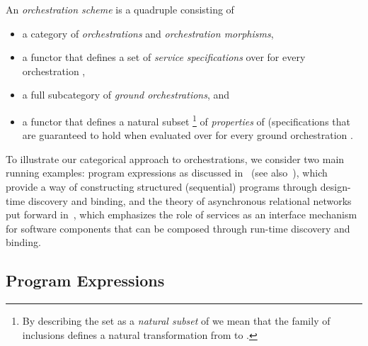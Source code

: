 \documentclass{LMCS}
\begin{document}
\begin{defi}
  An \emph{orchestration scheme} is a quadruple  consisting of
  \begin{itemize}
    
  \item a category  of \emph{orchestrations} and \emph{orchestration morphisms},

  \item a functor  that defines a set  of \emph{service specifications} over  for every orchestration ,

  \item a full subcategory  of \emph{ground orchestrations}, and

  \item a functor  that defines a natural subset \footnote{By describing the set  as a \emph{natural subset} of  we mean that the family of inclusions  defines a natural transformation from  to .} of \emph{properties} of  (specifications that are guaranteed to hold when evaluated over  for every ground orchestration .
    
  \end{itemize}
\end{defi}

\noindent To illustrate our categorical approach to orchestrations, we consider two main running examples: program expressions as discussed in~\cite{Fiadeiro:The-many-faces-of-complexity-in-software-design-2012} (see also~\cite{Morgan:Programming-from-Specifications-1994}), which provide a way of constructing structured (sequential) programs through design-time discovery and binding, and the theory of asynchronous relational networks put forward in~\cite{Fiadeiro-Lopes:An-interface-theory-for-service-oriented-design-2013}, which emphasizes the role of services as an interface mechanism for software components that can be composed through run-time discovery and binding.


\subsection{Program Expressions}
\label{subsection:program-expressions}
\end{document}
